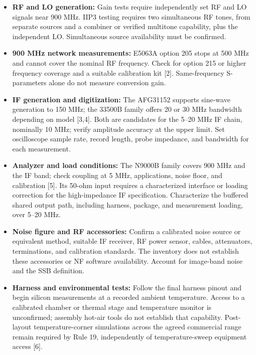 \documentclass[10pt,letterpaper]{article}
\begin{document}
\begin{itemize}
    \item \textbf{RF and LO generation:}
    Gain tests require independently set RF and LO signals near 900 MHz.
    IIP3 testing requires two simultaneous RF tones, from separate sources and a combiner or verified multitone capability, plus the independent LO.
    Simultaneous source availability must be confirmed.

    \item \textbf{900 MHz network measurements:}
    E5063A option 205 stops at 500 MHz and cannot cover the nominal RF frequency.
    Check for option 215 or higher frequency coverage and a suitable calibration kit [2].
    Same-frequency S-parameters alone do not measure conversion gain.

    \item \textbf{IF generation and digitization:}
    The AFG31152 supports sine-wave generation to 150 MHz; the 33500B family offers 20 or 30 MHz bandwidth depending on model [3,4].
    Both are candidates for the 5--20 MHz IF chain, nominally 10 MHz; verify amplitude accuracy at the upper limit.
    Set oscilloscope sample rate, record length, probe impedance, and bandwidth for each measurement.

    \item \textbf{Analyzer and load conditions:}
    The N9000B family covers 900 MHz and the IF band; check coupling at 5 MHz, applications, noise floor, and calibration [5].
    Its 50-ohm input requires a characterized interface or loading correction for the high-impedance IF specification.
    Characterize the buffered shared output path, including harness, package, and measurement loading, over 5--20 MHz.

    \item \textbf{Noise figure and RF accessories:}
    Confirm a calibrated noise source or equivalent method, suitable IF receiver, RF power sensor, cables, attenuators, terminations, and calibration standards.
    The inventory does not establish these accessories or NF software availability.
    Account for image-band noise and the SSB definition.

    \item \textbf{Harness and environmental tests:}
    Follow the final harness pinout and begin silicon measurements at a recorded ambient temperature.
    Access to a calibrated chamber or thermal stage and temperature monitor is unconfirmed; assembly hot-air tools do not establish that capability.
    Post-layout temperature-corner simulations across the agreed commercial range remain required by Rule 19, independently of temperature-sweep equipment access [6].
\end{itemize}
\end{document}

